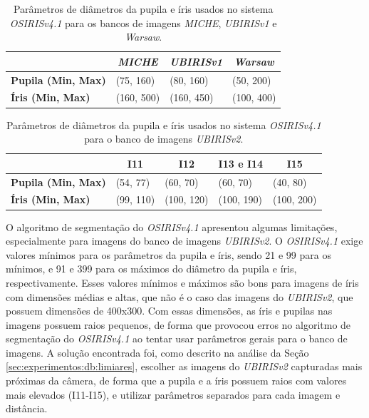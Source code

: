 \begin{table}[H]
\centering
\caption{Parâmetros de diâmetros da pupila e íris usados no sistema \textit{OSIRISv4.1} para os bancos de imagens \textit{MICHE}, \textit{UBIRISv1} e \textit{Warsaw}.}
\label{tab:experimentos:diametros}
\begin{tabular}{l|l|l|l|}
\cline{2-4}
 & \multicolumn{1}{c|}{\textit{\textbf{MICHE}}} & \multicolumn{1}{c|}{\textit{\textbf{UBIRISv1}}} & \multicolumn{1}{c|}{\textit{\textbf{Warsaw}}} \\ \hline
\multicolumn{1}{|l|}{\textbf{Pupila (Min, Max)}} & (75, 160) & (80, 160) & (50, 200) \\ \hline
\multicolumn{1}{|l|}{\textbf{Íris (Min, Max)}} & (160, 500) & (160, 450) & (100, 400) \\ \hline
\end{tabular}
\end{table}

\begin{table}[H]
\centering
\caption{Parâmetros de diâmetros da pupila e íris usados no sistema \textit{OSIRISv4.1} para o banco de imagens \textit{UBIRISv2}.}
\label{tab:experimentos:diametros_ubirisv2}
\begin{tabular}{l|l|l|l|l|}
\cline{2-5}
 & \multicolumn{1}{c|}{\textbf{I11}} & \multicolumn{1}{c|}{\textbf{I12}} & \multicolumn{1}{c|}{\textbf{I13 e I14}} & \multicolumn{1}{c|}{\textbf{I15}} \\ \hline
\multicolumn{1}{|l|}{\textbf{Pupila (Min, Max)}} & (54, 77) & (60, 70) & (60, 70) & (40, 80) \\ \hline
\multicolumn{1}{|l|}{\textbf{Íris (Min, Max)}} & (99, 110) & (100, 120) & (100, 190) & (100, 200) \\ \hline
\end{tabular}
\end{table}

\par O algoritmo de segmentação do \textit{OSIRISv4.1} apresentou algumas limitações, especialmente para imagens do banco de imagens \textit{UBIRISv2}. O \textit{OSIRISv4.1} exige valores mínimos para os parâmetros da pupila e íris, sendo 21 e 99 para os mínimos, e 91 e 399 para os máximos do diâmetro da pupila e íris, respectivamente. Esses valores mínimos e máximos são bons para imagens de íris com dimensões médias e altas, que não é o caso das imagens do \textit{UBIRISv2}, que possuem dimensões de 400x300. Com essas dimensões, as íris e pupilas nas imagens possuem raios pequenos, de forma que provocou erros no algoritmo de segmentação do \textit{OSIRISv4.1} ao tentar usar parâmetros gerais para o banco de imagens. A solução encontrada foi, como descrito na análise da Seção \ref{sec:experimentos:db:limiares}, escolher as imagens do \textit{UBIRISv2} capturadas mais próximas da câmera, de forma que a pupila e a íris possuem raios com valores mais elevados (I11-I15), e utilizar parâmetros separados para cada imagem e distância. 

